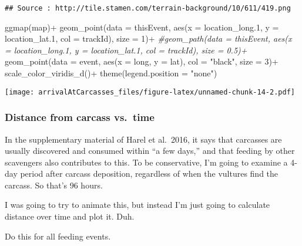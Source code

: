 \documentclass[
]{article}
\newenvironment{Shaded}{\begin{snugshade}}{\end{snugshade}}
\newcommand{\AttributeTok}[1]{\textcolor[rgb]{0.77,0.63,0.00}{#1}}
\newcommand{\CommentTok}[1]{\textcolor[rgb]{0.56,0.35,0.01}{\textit{#1}}}
\newcommand{\DecValTok}[1]{\textcolor[rgb]{0.00,0.00,0.81}{#1}}
\newcommand{\FloatTok}[1]{\textcolor[rgb]{0.00,0.00,0.81}{#1}}
\newcommand{\FunctionTok}[1]{\textcolor[rgb]{0.00,0.00,0.00}{#1}}
\newcommand{\NormalTok}[1]{#1}
\newcommand{\SpecialCharTok}[1]{\textcolor[rgb]{0.00,0.00,0.00}{#1}}
\newcommand{\StringTok}[1]{\textcolor[rgb]{0.31,0.60,0.02}{#1}}
\begin{document}
\begin{verbatim}
## Source : http://tile.stamen.com/terrain-background/10/611/419.png
\end{verbatim}

\begin{Shaded}
\begin{Highlighting}[]
\FunctionTok{ggmap}\NormalTok{(map)}\SpecialCharTok{+}
  \FunctionTok{geom\_point}\NormalTok{(}\AttributeTok{data =}\NormalTok{ thisEvent, }\FunctionTok{aes}\NormalTok{(}\AttributeTok{x =}\NormalTok{ location\_long}\FloatTok{.1}\NormalTok{, }\AttributeTok{y =}\NormalTok{ location\_lat}\FloatTok{.1}\NormalTok{, }\AttributeTok{col =}\NormalTok{ trackId), }\AttributeTok{size =} \DecValTok{1}\NormalTok{)}\SpecialCharTok{+}
  \CommentTok{\#geom\_path(data = thisEvent, aes(x = location\_long.1, y = location\_lat.1, col = trackId), size = 0.5)+}
  \FunctionTok{geom\_point}\NormalTok{(}\AttributeTok{data =}\NormalTok{ event, }\FunctionTok{aes}\NormalTok{(}\AttributeTok{x =}\NormalTok{ long, }\AttributeTok{y =}\NormalTok{ lat), }\AttributeTok{col =} \StringTok{"black"}\NormalTok{, }\AttributeTok{size =} \DecValTok{3}\NormalTok{)}\SpecialCharTok{+}
  \FunctionTok{scale\_color\_viridis\_d}\NormalTok{()}\SpecialCharTok{+}
  \FunctionTok{theme}\NormalTok{(}\AttributeTok{legend.position =} \StringTok{"none"}\NormalTok{)}
\end{Highlighting}
\end{Shaded}

\texttt{[image: arrivalAtCarcasses\_files/figure-latex/unnamed-chunk-14-2.pdf]}

\hypertarget{distance-from-carcass-vs.-time}{%
\subsubsection{Distance from carcass
vs.~time}\label{distance-from-carcass-vs.-time}}

In the supplementary material of Harel et al.~2016, it says that
carcasses are usually discovered and consumed within ``a few days,'' and
that feeding by other scavengers also contributes to this. To be
conservative, I'm going to examine a 4-day period after carcass
deposition, regardless of when the vultures find the carcass. So that's
96 hours.

I was going to try to animate this, but instead I'm just going to
calculate distance over time and plot it. Duh.

Do this for all feeding events.
\end{document}
